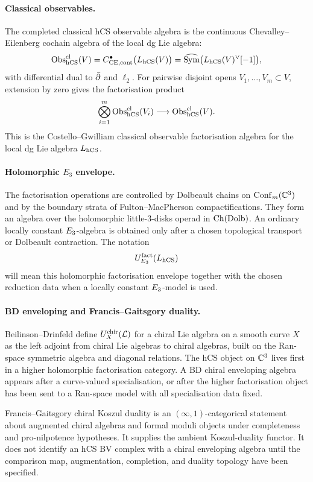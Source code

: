 \paragraph{Classical observables.}
The completed classical hCS observable algebra is the continuous
Chevalley--Eilenberg cochain algebra of the local dg Lie algebra:
\[
  \mathrm{Obs}^{\mathrm{cl}}_{\mathrm{hCS}}(V)
  =
  C^\bullet_{\mathrm{CE},\mathrm{cont}}\bigl(L_{\mathrm{hCS}}(V)\bigr)
  =
  \widehat{\mathrm{Sym}}\bigl(L_{\mathrm{hCS}}(V)^\vee[-1]\bigr),
\]
with differential dual to \(\bar\partial\) and \(\ell_2\). For pairwise
disjoint opens \(V_1,\ldots,V_m\subset V\), extension by zero gives the
factorisation product
\[
  \bigotimes_{i=1}^m \mathrm{Obs}^{\mathrm{cl}}_{\mathrm{hCS}}(V_i)
  \longrightarrow
  \mathrm{Obs}^{\mathrm{cl}}_{\mathrm{hCS}}(V).
\]
This is the Costello--Gwilliam classical observable factorisation
algebra for the local dg Lie algebra \(L_{\mathrm{hCS}}\).

\paragraph{Holomorphic \texorpdfstring{\(E_3\)}{E3} envelope.}
The factorisation operations are controlled by Dolbeault chains on
\(\mathrm{Conf}_m(\mathbb{C}^3)\) and by the boundary strata of Fulton--MacPherson
compactifications. They form an algebra over the holomorphic
little-\(3\)-disks operad in \(\mathrm{Ch}(\mathrm{Dolb})\). An ordinary locally
constant \(E_3\)-algebra is obtained only after a chosen
topological transport or Dolbeault contraction. The notation
\[
  U^{\mathrm{fact}}_{E_3}(L_{\mathrm{hCS}})
\]
will mean this holomorphic factorisation envelope together with the
chosen reduction data when a locally constant \(E_3\)-model is used.

\paragraph{BD enveloping and Francis--Gaitsgory duality.}
Beilinson--Drinfeld define \(U^{\mathrm{chir}}_X(\mathcal{L})\) for a chiral Lie algebra
on a smooth curve \(X\) as the left adjoint from chiral Lie algebras to
chiral algebras, built on the Ran-space symmetric algebra and diagonal
relations. The hCS object on \(\mathbb{C}^3\) lives first in a higher
holomorphic factorisation category. A BD chiral enveloping algebra
appears after a curve-valued specialisation, or after the higher
factorisation object has been sent to a Ran-space model with all
specialisation data fixed.

Francis--Gaitsgory chiral Koszul duality is an
\((\infty,1)\)-categorical statement about augmented chiral algebras and
formal moduli objects under completeness and pro-nilpotence hypotheses.
It supplies the ambient Koszul-duality functor. It does not identify an
hCS BV complex with a chiral enveloping algebra until the comparison map,
augmentation, completion, and duality topology have been specified.

